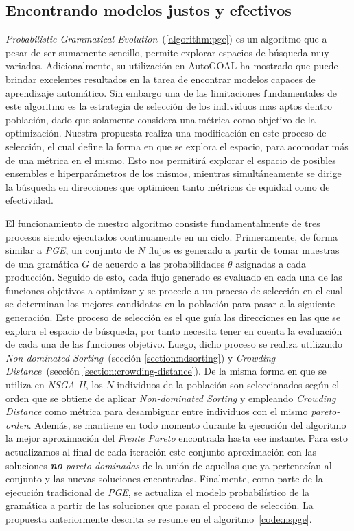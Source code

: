 \subsection{Encontrando modelos justos y efectivos}

\emph{Probabilistic Grammatical Evolution}~(\ref{algorithm:pge}) es un algoritmo que a pesar de ser sumamente sencillo, permite explorar espacios de búsqueda muy variados.
Adicionalmente, su utilización en AutoGOAL ha mostrado que puede brindar excelentes resultados en la tarea de encontrar modelos capaces de aprendizaje automático.
Sin embargo una de las limitaciones fundamentales de este algoritmo es la estrategia de selección de los individuos mas aptos dentro población, dado que solamente considera una métrica como objetivo de la optimización.
Nuestra propuesta realiza una modificación en este proceso de selección, el cual define la forma en que se explora el espacio, para acomodar más de una métrica en el mismo.
Esto nos permitirá explorar el espacio de posibles ensembles e hiperparámetros de los mismos, mientras simultáneamente se dirige la búsqueda en direcciones que optimicen tanto métricas de equidad como de efectividad.

El funcionamiento de nuestro algoritmo consiste fundamentalmente de tres procesos siendo ejecutados continuamente en un ciclo.
Primeramente, de forma similar a \emph{PGE}, un conjunto de $N$ flujos es generado a partir de tomar muestras de una gramática $G$ de acuerdo a las probabilidades $\theta$ asignadas a cada producción.
Seguido de esto, cada flujo generado es evaluado en cada una de las funciones objetivos a optimizar y se procede a un proceso de selección en el cual se determinan los mejores candidatos en la población para pasar a la siguiente generación.
Este proceso de selección es el que guía las direcciones en las que se explora el espacio de búsqueda, por tanto necesita tener en cuenta la evaluación de cada una de las funciones objetivo.
Luego, dicho proceso se realiza utilizando \emph{Non-dominated Sorting}~(sección \ref{section:ndsorting}) y \emph{Crowding Distance}~(sección \ref{section:crowding-distance}).
De la misma forma en que se utiliza en \emph{NSGA-II}, los $N$ individuos de la población son seleccionados según el orden que se obtiene de aplicar \emph{Non-dominated Sorting} y empleando \emph{Crowding Distance} como métrica para desambiguar entre individuos con el mismo \emph{pareto-orden}.
Además, se mantiene en todo momento durante la ejecución del algoritmo la mejor aproximación del \emph{Frente Pareto} encontrada hasta ese instante.
Para esto actualizamos al final de cada iteración este conjunto aproximación con las soluciones \emph{\textbf{no} pareto-dominadas} de la unión de aquellas que ya pertenecían al conjunto y las nuevas soluciones encontradas.
Finalmente, como parte de la ejecución tradicional de \emph{PGE}, se actualiza el modelo probabilístico de la gramática a partir de las soluciones que pasan el proceso de selección.
La propuesta anteriormente descrita se resume en el algoritmo~\ref{code:nspge}.

